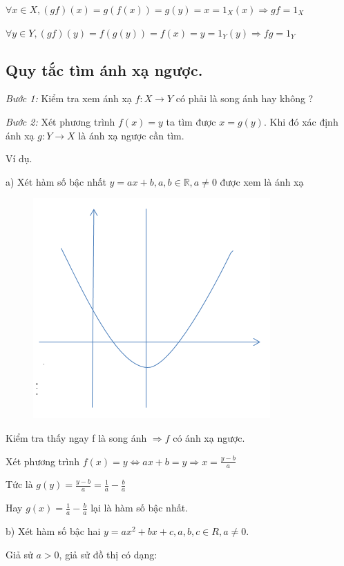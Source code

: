 \documentclass[12pt,oneside,a4paper,reqno]{book}
\begin{document}
$\forall x\in X,(gf)(x)=g(f(x))=g(y)=x=1_X (x) \Rightarrow gf=1_X$

$\forall y\in Y,(gf)(y)=f(g(y))=f(x)=y=1_Y (y)\Rightarrow fg=1_Y$

\subsection{Quy tắc tìm ánh xạ ngược.}
   \emph{Bước 1: }Kiểm tra xem ánh xạ $f:X\to Y$ có phải là song ánh hay không ?
   
  \emph{ Bước 2: }Xét phương trình $f(x)=y$ ta tìm được $x=g(y)$. Khi đó xác định ánh xạ $g:Y\to X$ là ánh xạ ngược cần tìm.
   
Ví dụ.

a)	Xét hàm số bậc nhất $y=ax+b,   a,b\in \mathbb{R},a\neq 0$ được xem là ánh xạ 

\begin{figure}

    \includegraphics[scale=0.5]{hinh6}
\end{figure}


     Kiểm tra thấy ngay f là song ánh $\Rightarrow f$ có ánh xạ ngược.
     
     Xét phương trình $f(x)=y \Leftrightarrow ax+b=y\Rightarrow x=\frac{y-b}{a}$

     Tức là $g(y)=\frac{y-b}{a}=\frac{1}{a}-\frac{b}{a}$

     Hay $g(x)=\frac{1}{a}-\frac{b}{a}$  lại là hàm số bậc nhất.

b) Xét hàm số bậc hai $y=ax^2+bx+c,a,b,c\in R,a\neq 0.$

Giả sử $a>0$, giả sử đồ thị có dạng:
\end{document}

